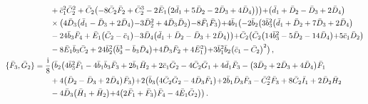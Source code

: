 \documentclass[10pt]{amsart}
\theoremstyle{definition}
\theoremstyle{corollary}
\theoremstyle{remark}
\theoremstyle{conclusion}
\begin{document}
\begin{align}
& \hskip 0.7cm+\bar{c}_1^2 \bar{C}_2^2+\bar{C}_2 \bigl(-8 \bar{C}_2 \bar{F}_2+\bar{C}_2^3-2 \bar{E}_1 \bigl(2 \bar{d}_1+5 \bar{D}_2-2 \bar{D}_3+4 \bar{D}_4\bigl)\bigl)\bigl)+\bigl(\bar{d}_1+\bar{D}_2-\bar{D}_3+2 \bar{D}_4\bigl)\nonumber\\
& \hskip 0.7cm \times \bigl(4 \bar{D}_3 \bigl(\bar{d}_1-\bar{D}_3+2 \bar{D}_4\bigl)-3 \bar{D}_2^2+4 \bar{D}_3 \bar{D}_2\bigl)-8 \bar{F}_1 \bar{F}_3\bigl)+4 \bar{b}_1 \bigl(-2 \bar{b}_2 \bigl(3 \bar{b}_3^2 \bigl(\bar{d}_1+\bar{D}_2+7 \bar{D}_3+2 \bar{D}_4\bigl)\nonumber\\
& \hskip 0.7cm-24 \bar{b}_3 \bar{F}_4+\bar{E}_1 \bigl(\bar{C}_2-\bar{c}_1\bigl)-3 \bar{D}_4 \bigl(\bar{d}_1+\bar{D}_2-\bar{D}_3+2 \bar{D}_4\bigl)\bigl)+\bar{C}_2 \bigl(\bar{C}_2 \bigl(14 \bar{b}_3^2-5 \bar{D}_2-14 \bar{D}_4\bigl)+5 \bar{c}_1 \bar{D}_2\bigl)\nonumber\\
& \hskip 0.7cm-8 \bar{E}_1 \bar{b}_3 \bar{C}_2+24 \bar{b}_2^2 \bigl(\bar{b}_3^3-\bar{b}_3 \bar{D}_4\bigl)+4 \bar{D}_3 \bar{F}_2+4 \bar{E}_1^2\bigl)+3 \bar{b}_1^2 \bar{b}_2 \bigl(\bar{c}_1-\bar{C}_2\bigl)^2\bigl) \,, \nonumber \\
\{\bar{F}_3, \bar{G}_2\}&=\frac{{\rm i}}{8}  \bigl(\bar{b}_2 \bigl(4 \bar{b}_3^2 \bar{F}_1-4 \bar{b}_1 \bar{b}_3 \bar{F}_3+2 \bar{b}_1 \bar{H}_2+2 \bar{c}_1 \bar{G}_2-4 \bar{C}_2 \bar{G}_1+4 \bar{d}_1 \bar{F}_3-\bigl(3 \bar{D}_2+2 \bar{D}_3+4 \bar{D}_4\bigl) \bar{F}_1 \nonumber\\
& \hskip 0.7cm+4 \bigl(\bar{D}_2-\bar{D}_3+2 \bar{D}_4\bigl) \bar{F}_3\bigl)+2 \bigl(\bar{b}_3 \bigl(4 \bar{C}_2 \bar{G}_2-4 \bar{D}_3 \bar{F}_1\bigl)+2 \bar{b}_1 \bar{D}_3 \bar{F}_3-\bar{C}_2^2 \bar{F}_3+8 \bar{C}_2 \bar{I}_1+2 \bar{D}_2 \bar{H}_2 \nonumber\\
& \hskip 0.7cm-4 \bar{D}_3\bigl(\bar{H}_1+\bar{H}_2\bigl)+4 \bigl(2 \bar{F}_1+\bar{F}_3\bigl) \bar{F}_4-4 \bar{E}_1 \bar{G}_2\bigl)\bigl) \,.  %
 \end{align}
\end{document}
